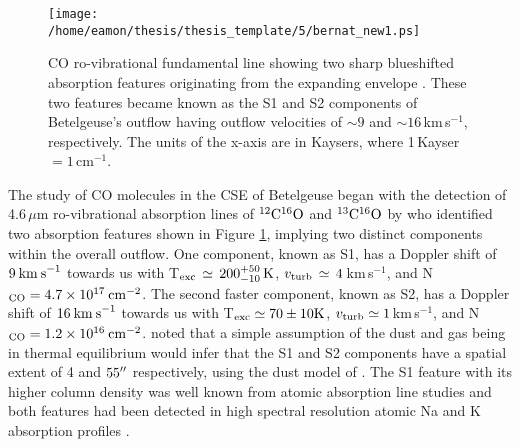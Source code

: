 \begin{figure}[!t]
\centering 
          \texttt{[image: /home/eamon/thesis/thesis\_template/5/bernat\_new1.ps]}
\caption[Bernat (1979) CO line profile showing two sharp line cores]{CO ro-vibrational fundamental line showing two sharp blueshifted absorption features originating from the expanding envelope \citep{bernat_1979}. These two features became known as the S1 and S2 components of Betelgeuse's outflow having outflow velocities of $\sim 9$ and $\sim 16$\,km\,s$^{-1}$, respectively. The units of the x-axis are in Kaysers, where 1\,Kayser\,$ = 1$\,cm$^{-1}$.}
\label{fig:5.1}
\end{figure}

The study of CO molecules in the CSE of Betelgeuse began with the detection of 4.6\,$\mu$m ro-vibrational absorption lines of $\rm{{}^{12}C^{16}O}$ and $\rm{{}^{13}C^{16}O}$ by \cite{bernat_1979} who identified two absorption features shown in Figure \ref{fig:5.1}, implying two distinct components within the overall outflow. One component, known as S1, has a Doppler shift of $9\>{\rm km\>s}^{-1}$ towards us with T$_{\rm{exc}}\,\simeq\,200^{+50}_{-10}\,\rm{K}$, $v_{\rm{turb}}\,\simeq\,4$\,km\,s${}^{-1}$, and N$_{\rm{CO}}=4.7\times 10^{17}\>{\rm cm}^{-2}$. The second faster component, known as S2, has a Doppler shift of $16\>{\rm km\>s}^{-1}$ towards us with T$_{\rm{exc}} \simeq 70 \pm 10 \rm{K}$, $v_{\rm{turb}}\simeq 1$\,km\,s${}^{-1}$, and N$_{\rm{CO}}=1.2\times 10^{16}\>{\rm cm}^{-2}$. \cite{bernat_1979} noted that a simple assumption of the dust and gas being in thermal equilibrium would infer that the S1 and S2 components have a spatial extent of 4 and $55^{\prime\prime}$ respectively, using the dust model of \cite{tsuji_1979}. The S1 feature with its higher column density was well known from atomic absorption line studies \citep[e.g.,][]{weymann_1962} and both features had been detected in high spectral resolution atomic Na and K absorption profiles \citep{goldberg_1975}.

